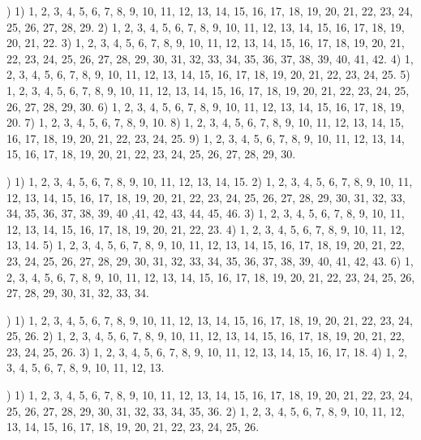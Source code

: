 \documentclass[a4paper,11pt]{article}
\begin{document}
\noindent
{}) 1) 1, 2, 3, 4, 5, 6, 7, 8, 9, 10, 11, 12, 13, 14, 15,
16, 17, 18, 19, 20, 21, 22, 23, 24, 25, 26, 27, 28, 29. 2) 1, 2, 3, 4,
5, 6, 7, 8, 9, 10, 11, 12, 13, 14, 15, 16, 17, 18, 19, 20, 21, 22.
3) 1, 2, 3, 4, 5, 6, 7, 8, 9, 10, 11, 12, 13, 14, 15, 16, 17, 18, 19,
20, 21, 22, 23, 24, 25, 26, 27, 28, 29, 30, 31, 32, 33, 34, 35, 36, 37,
38, 39, 40, 41, 42. 4) 1, 2, 3, 4, 5, 6, 7, 8, 9, 10, 11, 12, 13, 14,
15, 16, 17, 18, 19, 20, 21, 22, 23, 24, 25. 5) 1, 2, 3, 4, 5, 6, 7, 8,
9, 10, 11, 12, 13, 14, 15, 16, 17, 18, 19, 20, 21, 22, 23, 24, 25, 26,
27, 28, 29, 30. 6) 1, 2, 3, 4, 5, 6, 7, 8, 9, 10, 11, 12, 13, 14, 15,
16, 17, 18, 19, 20. 7) 1, 2, 3, 4, 5, 6, 7, 8, 9, 10. 8) 1, 2, 3, 4, 5,
6, 7, 8, 9, 10, 11, 12, 13, 14, 15, 16, 17, 18, 19, 20, 21, 22, 23, 24,
25. 9) 1, 2, 3, 4, 5, 6, 7, 8, 9, 10, 11, 12, 13, 14, 15, 16, 17, 18,
19, 20, 21, 22, 23, 24, 25, 26, 27, 28, 29, 30.

\vspace{\spaceFour}



\noindent
{}) 1) 1, 2, 3, 4, 5, 6, 7, 8, 9, 10, 11, 12, 13, 14, 15.
2) 1, 2, 3, 4, 5, 6, 7, 8, 9, 10, 11, 12, 13, 14, 15, 16, 17, 18, 19,
20, 21, 22, 23, 24, 25, 26, 27, 28, 29, 30, 31, 32, 33, 34, 35, 36, 37,
38, 39, 40 ,41, 42, 43, 44, 45, 46. 3) 1, 2, 3, 4, 5, 6, 7, 8, 9, 10,
11, 12, 13, 14, 15, 16, 17, 18, 19, 20, 21, 22, 23. 4) 1, 2, 3, 4, 5,
6, 7, 8, 9, 10, 11, 12, 13, 14. 5) 1, 2, 3, 4, 5, 6, 7, 8, 9, 10, 11,
12, 13, 14, 15, 16, 17, 18, 19, 20, 21, 22, 23, 24, 25, 26, 27, 28, 29,
30, 31, 32, 33, 34, 35, 36, 37, 38, 39, 40, 41, 42, 43. 6) 1, 2, 3, 4,
5, 6, 7, 8, 9, 10, 11, 12, 13, 14, 15, 16, 17, 18, 19, 20, 21, 22, 23,
24, 25, 26, 27, 28, 29, 30, 31, 32, 33, 34.

\vspace{\spaceFour}



\noindent
{}) 1) 1, 2, 3, 4, 5, 6, 7, 8, 9, 10, 11, 12, 13, 14, 15,
16, 17, 18, 19, 20, 21, 22, 23, 24, 25, 26. 2) 1, 2, 3, 4, 5, 6, 7, 8,
9, 10, 11, 12, 13, 14, 15, 16, 17, 18, 19, 20, 21, 22, 23, 24, 25, 26.
3) 1, 2, 3, 4, 5, 6, 7, 8, 9, 10, 11, 12, 13, 14, 15, 16, 17, 18.
4) 1, 2, 3, 4, 5, 6, 7, 8, 9, 10, 11, 12, 13.

\vspace{\spaceFour}



\noindent
{}) 1) 1, 2, 3, 4, 5, 6, 7, 8, 9, 10, 11, 12, 13, 14, 15,
16, 17, 18, 19, 20, 21, 22, 23, 24, 25, 26, 27, 28, 29, 30, 31, 32, 33,
34, 35, 36. 2) 1, 2, 3, 4, 5, 6, 7, 8, 9, 10, 11, 12, 13, 14, 15, 16, 17,
18, 19, 20, 21, 22, 23, 24, 25, 26.
\end{document}
